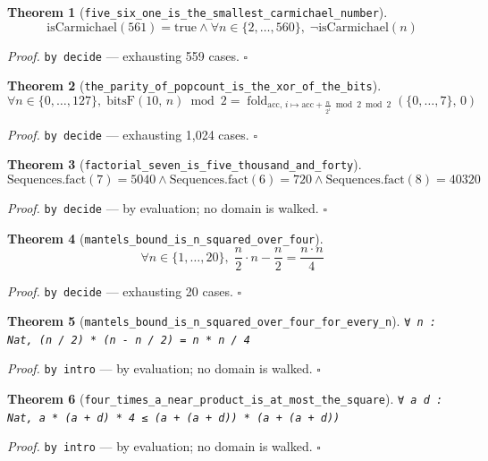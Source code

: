 \documentclass[11pt]{article}
\newtheorem{theorem}{Theorem}[section]
\begin{document}
\begin{theorem}[\texttt{five\_six\_one\_is\_the\_smallest\_carmichael\_number}]
\[ \mathrm{isCarmichael}\mathopen{}\left(561\right) = \mathrm{true} \land \forall n \in \{2,\dots,560\},\; \lnot \mathrm{isCarmichael}\mathopen{}\left(n\right) \]
\end{theorem}
\noindent\emph{Proof.} \texttt{by decide} --- exhausting 559 cases. \hfill$\square$

\begin{theorem}[\texttt{the\_parity\_of\_popcount\_is\_the\_xor\_of\_the\_bits}]
\[ \forall n \in \{0,\dots,127\},\; \mathrm{bitsF}\mathopen{}\left(10,\,n\right) \bmod 2 = \operatorname{fold}_{\mathrm{acc},\,i \mapsto \mathrm{acc} + \frac{n}{2^{i}} \bmod 2 \bmod 2}\left(\{0,\dots,7\},\, 0\right) \]
\end{theorem}
\noindent\emph{Proof.} \texttt{by decide} --- exhausting 1,024 cases. \hfill$\square$

\begin{theorem}[\texttt{factorial\_seven\_is\_five\_thousand\_and\_forty}]
\[ \mathrm{Sequences.fact}\mathopen{}\left(7\right) = 5040 \land \mathrm{Sequences.fact}\mathopen{}\left(6\right) = 720 \land \mathrm{Sequences.fact}\mathopen{}\left(8\right) = 40320 \]
\end{theorem}
\noindent\emph{Proof.} \texttt{by decide} --- by evaluation; no domain is walked. \hfill$\square$

\begin{theorem}[\texttt{mantels\_bound\_is\_n\_squared\_over\_four}]
\[ \forall n \in \{1,\dots,20\},\; \frac{n}{2} \cdot n - \frac{n}{2} = \frac{n \cdot n}{4} \]
\end{theorem}
\noindent\emph{Proof.} \texttt{by decide} --- exhausting 20 cases. \hfill$\square$

\begin{theorem}[\texttt{mantels\_bound\_is\_n\_squared\_over\_four\_for\_every\_n}]
\texttt{∀ n : Nat, (n / 2) * (n - n / 2) = n * n / 4}
\end{theorem}
\noindent\emph{Proof.} \texttt{by
  intro} --- by evaluation; no domain is walked. \hfill$\square$

\begin{theorem}[\texttt{four\_times\_a\_near\_product\_is\_at\_most\_the\_square}]
\texttt{∀ a d : Nat, a * (a + d) * 4 ≤ (a + (a + d)) * (a + (a + d))}
\end{theorem}
\noindent\emph{Proof.} \texttt{by
  intro} --- by evaluation; no domain is walked. \hfill$\square$
\end{document}
